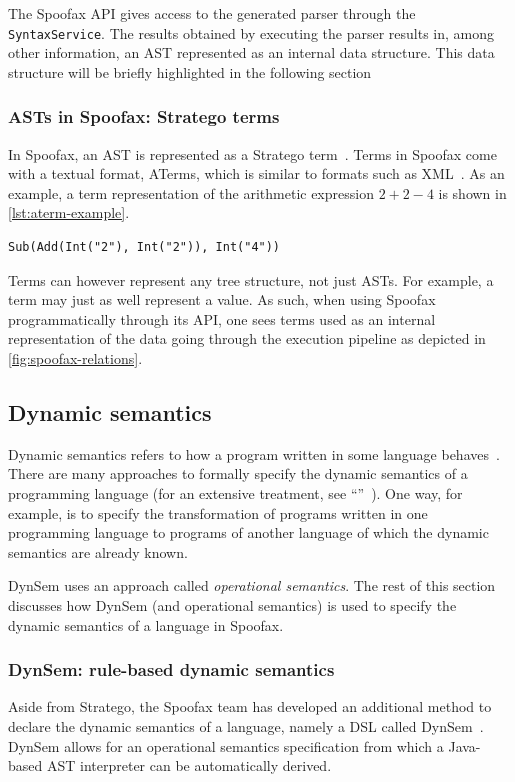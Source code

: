 The Spoofax API gives access to the generated parser through the
\texttt{SyntaxService}. The results obtained by executing the parser results in,
among other information, an AST represented as an internal data structure. This
data structure will be briefly highlighted in the following section

\subsubsection{ASTs in Spoofax: Stratego terms}
\label{sec:asts-spoof-strat}
In Spoofax, an AST is represented as a Stratego term~\cite{Kats10a}. Terms in
Spoofax come with a textual format, ATerms, which is similar to formats such as
XML~\cite{Brand00}. As an example, a term representation of the arithmetic
expression $2 + 2 - 4$ is shown in \cref{lst:aterm-example}.

\begin{lstlisting}[caption={An example ATerm representation of an arithmetic
expression.},language=aterm,label={lst:aterm-example}]
Sub(Add(Int("2"), Int("2")), Int("4"))
\end{lstlisting}

Terms can however represent any tree structure, not just ASTs. For example, a
term may just as well represent a value. As such, when using Spoofax
programmatically through its API, one sees terms used as an internal
representation of the data going through the execution pipeline as depicted in
\cref{fig:spoofax-relations}.

\subsection{Dynamic semantics}
\label{ssec:dynamic-semantics}
Dynamic semantics refers to how a program written in some language
behaves~\cite{Winskel93}. There are many approaches to formally specify the
dynamic semantics of a programming language (for an extensive treatment, see
``''~\cite{Winskel93}). One way, for example, is
to specify the transformation of programs written in one programming language to
programs of another language of which the dynamic semantics are already known.

DynSem uses an approach called \textit{operational semantics}. The rest of this
section discusses how DynSem (and operational semantics) is used to specify the
dynamic semantics of a language in Spoofax.

\subsubsection{DynSem: rule-based dynamic semantics}
\label{ssec:dynsem}
Aside from Stratego, the Spoofax team has developed an additional method to
declare the dynamic semantics of a language, namely a DSL called
DynSem~\cite{VerguNV15}. DynSem allows for an operational semantics
specification from which a Java-based AST interpreter can be automatically
derived.

